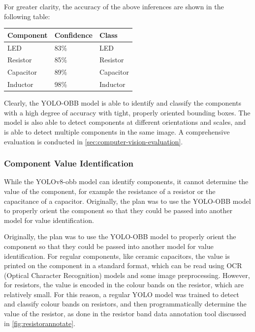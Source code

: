 For greater clarity, the accuracy of the above inferences are shown in the following table:
\begin{table}[H]
  \centering
  \begin{tabularx}{0.9\textwidth}{|X|X|X|}
    \hline
    \textbf{Component} & \textbf{Confidence} & \textbf{Class} \\
    \hline
    LED & 83\% & LED \\
    \hline
    Resistor & 85\% & Resistor \\
    \hline
    Capacitor & 89\% & Capacitor \\
    \hline
    Inductor & 98\% & Inductor \\
    \hline
  \end{tabularx}
\end{table}

Clearly, the YOLO-OBB model is able to identify and classify the components with a high degree of accuracy with tight, properly oriented bounding boxes. The model is also able to detect components at different orientations and scales, and is able to detect multiple components in the same image. A comprehensive evaluation is conducted in \autoref{sec:computer-vision-evaluation}.

\subsubsection{Component Value Identification}
\label{sec:component-value-identification}
While the YOLOv8-obb model can identify components, it cannot determine the value of the component, for example the resistance of a resistor or the capacitance of a capacitor. Originally, the plan was to use the YOLO-OBB model to properly orient the component so that they could be passed into another model for value identification.

Originally, the plan was to use the YOLO-OBB model to properly orient the component so that they could be passed into another model for value identification. For regular components, like ceramic capacitors, the value is printed on the component in a standard format, which can be read using OCR (Optical Character Recognition) models and some image preprocessing. However, for resistors, the value is encoded in the colour bands on the resistor, which are relatively small. For this reason, a regular YOLO model was trained to detect and classify colour bands on resistors, and then programmatically determine the value of the resistor, as done in the resistor band data annotation tool discussed in \autoref{fig:resistorannotate}.

